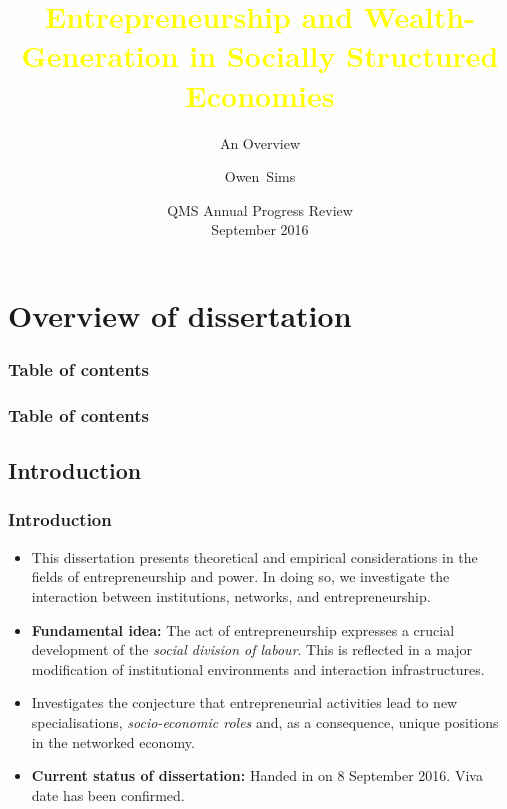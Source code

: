 \documentclass[10pt]{beamer}
\title[EntrepreneurshipSSE]{\textcolor{yellow}{Entrepreneurship and Wealth-Generation in Socially Structured Economies}}
\subtitle{An Overview}
\author[Sims]{Owen~Sims}
\institute[QUB]{Center for Data Science and Scalable Computing\\ Queen's University Belfast}
\date[APR 2016]{QMS Annual Progress Review\\ September 2016}
\begin{document}
\begin{frame}
\titlepage
\end{frame}

\section{Overview of dissertation}

\begin{frame}
\frametitle{Table of contents}
\tableofcontents
\end{frame}

\begin{frame}
\frametitle{Table of contents}
\tableofcontents[currentsection]
\end{frame}

\subsection{Introduction}

\begin{frame} \frametitle{Introduction}
\begin{itemize}
\item This dissertation presents theoretical and empirical considerations in the fields of entrepreneurship and power. In doing so, we investigate the interaction between institutions, networks, and entrepreneurship.
\medskip
\item \textbf{Fundamental idea:} The act of entrepreneurship expresses a crucial development of the \emph{social division of labour}. This is reflected in a major modification of institutional environments and interaction infrastructures.
\medskip
\item Investigates the conjecture that entrepreneurial activities lead to new specialisations, \emph{socio-economic roles} and, as a consequence, unique positions in the networked economy.
\medskip
\item \textbf{Current status of dissertation:} Handed in on 8 September 2016. Viva date has been confirmed.
\end{itemize}
\end{frame}
\end{document}
